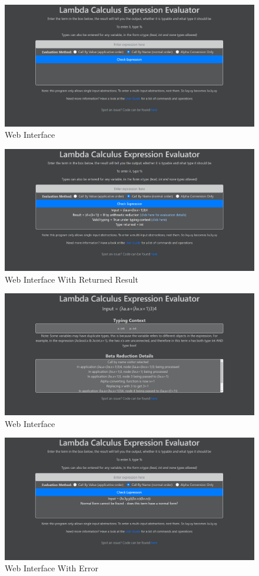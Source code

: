 \documentclass[a4paper,11pt]{article}
\begin{document}
\begin{figure}[p]
	\includegraphics[scale=0.4]{images/web_interface_no_input}
	\centering
	\caption{Web Interface}
	\label{web_interface_no_input}
\end{figure}

\begin{figure}[p]
	\centering
	\includegraphics[scale=0.4]{images/web_interface_input}
	\caption{Web Interface With Returned Result}
	\label{web_interface_input}
\end{figure}

\begin{figure}[p]
	\includegraphics[scale=0.4]{images/web_interface_more_information}
	\centering
	\caption{Web Interface}
	\label{web_interface_more_information}
\end{figure}

\begin{figure}[p]
	\centering
	\includegraphics[scale=0.4]{images/web_interface_error}
	\caption{Web Interface With Error}
	\label{web_interface_error}
\end{figure}
\end{document}
